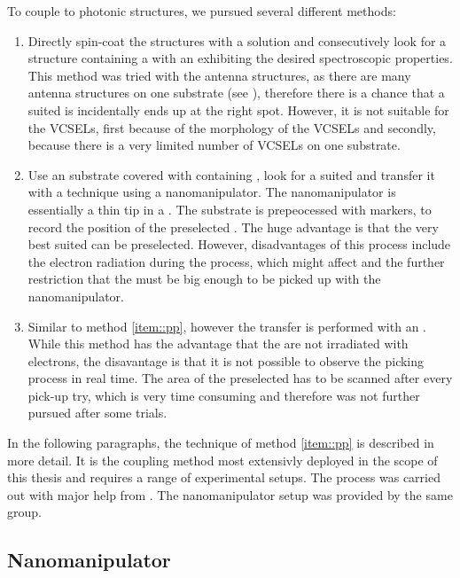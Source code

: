 	To couple \nds to photonic structures, we pursued several different methods: 
	\begin{enumerate} 
		\item Directly spin-coat the structures with a \nd solution and consecutively look for a structure containing a \nds with an \siv exhibiting the desired spectroscopic properties. This method was tried with the antenna structures, as there are many antenna structures on one substrate (see ), therefore there is a chance that a suited \nd is incidentally ends up at the right spot. However, it is not suitable for the VCSELs, first because of the morphology of the VCSELs and secondly, because there is a very limited number of VCSELs on one substrate.
		\item \label{item::pp}Use an \ir substrate covered with \nds containing \sivs, look for a suited \nd and transfer it with a \pp technique using a nanomanipulator. The nanomanipulator is essentially a thin tip in a \sem. The \ir substrate is prepeocessed with markers, to record the position of the preselected \nd. The huge advantage is that the very best suited \nd can be preselected. However, disadvantages of this process include the electron radiation during the \pp process, which might affect \siv \fl and the further restriction that the \nds must be big enough to be picked up with the nanomanipulator. 
		\item Similar to method \ref{item::pp}, however the transfer is performed with an \afm. While this method has the advantage that the \nds are not irradiated with electrons, the disavantage is that it is not possible to  observe the picking process in real time. The area of the preselected \nd has to be scanned after every pick-up try, which is very time consuming and therefore was not further pursued after some trials.
	\end{enumerate}

	In the following paragraphs, the \pp technique of method \ref{item::pp} is described in more detail.
	It is the coupling method most extensivly deployed in the scope of this thesis and requires a range of experimental setups. 
	The \pp process was carried out with major help from \pauly.
	The nanomanipulator setup was provided by the same group.
	\\
	\subsection{Nanomanipulator} \label{subsec::nanomanipulator}

